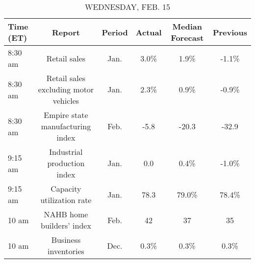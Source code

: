 \documentclass{article}%
\begin{document}
%


\begin{table}[htbp]%
\caption{WEDNESDAY, FEB. 15}%
\centering%
\begin{adjustbox}{width=1\textwidth}%
\begin{tabular}{lccccc}
\toprule
Time (ET) &                                Report & Period & Actual & Median Forecast & Previous \\
\midrule
  8:30 am &                          Retail sales &   Jan. &   3.0\% &            1.9\% &    -1.1\% \\
  8:30 am & Retail sales excluding motor vehicles &   Jan. &   2.3\% &            0.9\% &    -0.9\% \\
  8:30 am &      Empire state manufacturing index &   Feb. &   -5.8 &           -20.3 &    -32.9 \\
  9:15 am &           Industrial production index &   Jan. &    0.0 &            0.4\% &    -1.0\% \\
  9:15 am &             Capacity utilization rate &   Jan. &   78.3 &           79.0\% &    78.4\% \\
    10 am &             NAHB home builders' index &   Feb. &     42 &              37 &       35 \\
    10 am &                  Business inventories &   Dec. &   0.3\% &            0.3\% &     0.3\% \\
\bottomrule
\end{tabular}
%
\end{adjustbox}%
\end{table}

%
\end{document}
